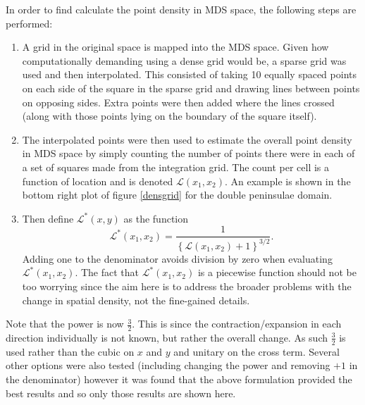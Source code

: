 In order to find calculate the point density in MDS space, the following steps are performed:
\begin{enumerate}
\item A grid in the original space is mapped into the MDS space. Given how computationally demanding using a dense grid would be, a sparse grid was used and then interpolated. This consisted of taking 10 equally spaced points on each side of the square in the sparse grid and drawing lines between points on opposing sides. Extra points were then added where the lines crossed (along with those points lying on the boundary of the square itself).
\item The interpolated points were then used to estimate the overall point density in MDS space by simply counting the number of points there were in each of a set of squares made from the integration grid. The count per cell is a function of location and is denoted $\mathcal{L}(x_1,x_2)$. An example is shown in the bottom right plot of figure \ref{densgrid} for the double peninsulae domain. 
\item Then define $\mathcal{L}^*(x,y)$ as the function
\begin{equation*}
\mathcal{L}^*(x_1,x_2)=\frac{1}{ \left \{\mathcal{L}(x_1,x_2) +1 \right \}^{3/2}}.
\end{equation*}
Adding one to the denominator avoids division by zero when evaluating $\mathcal{L}^*(x_1,x_2)$. The fact that $\mathcal{L}^*(x_1,x_2)$ is a piecewise function should not be too worrying since the aim here is to address the broader problems with the change in spatial density, not the fine-gained details.
\end{enumerate}

Note that the power is now $\frac{3}{2}$. This is since the contraction/expansion in each direction individually is not known, but rather the overall change. As such $\frac{3}{2}$ is used rather than the cubic on $x$ and $y$ and unitary on the cross term. Several other options were also tested (including changing the power and removing $+1$ in the denominator) however it was found that the above formulation provided the best results and so only those results are shown here.

